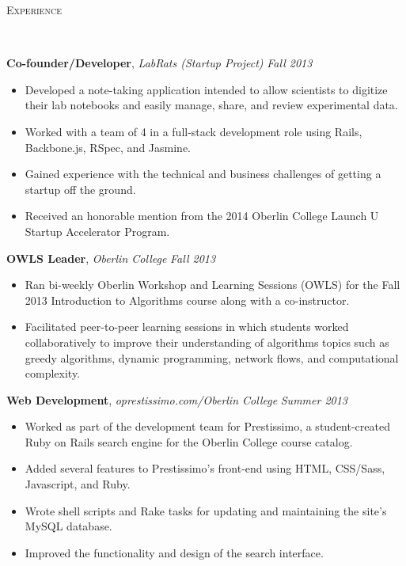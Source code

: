 \documentclass[9pt]{article}
\newenvironment{changemargin}[2]{%
  \begin{list}{}{%
    \setlength{\topsep}{0pt}%
    \setlength{\leftmargin}{#1}%
    \setlength{\rightmargin}{#2}%
    \setlength{\listparindent}{\parindent}%
    \setlength{\itemindent}{\parindent}%
    \setlength{\parsep}{\parskip}%
  }%
  \item[]}{\end{list}
}
\newcommand{\lineover}{
	\begin{changemargin}{-0.05in}{-0.05in}
		\vspace*{-8pt}
		\hrulefill \\
		\vspace*{-2pt}
	\end{changemargin}
}
\newcommand{\header}[1]{
	\begin{changemargin}{-0.5in}{-0.5in}
		\scshape{#1}\\
  	\lineover
	\end{changemargin}
}
\newenvironment{body} {
	\vspace*{-16pt}
	\begin{changemargin}{-0.25in}{-0.5in}
  }	
	{\end{changemargin}
}
\begin{document}
\header{Experience}

\begin{body}
	\vspace{14pt}

	\textbf{Co-founder/Developer}, \emph{LabRats (Startup Project)} \hfill \emph{Fall 2013}\\
	\vspace*{-4pt}
	\begin{itemize} \itemsep -0pt  %
		\item Developed a note-taking application intended to allow scientists to digitize their lab notebooks and easily manage, share, and review experimental data.
		\item Worked with a team of 4 in a full-stack development role using Rails, Backbone.js, RSpec, and Jasmine.
		\item Gained experience with the technical and business challenges of getting a startup off the ground.
		\item Received an honorable mention from the 2014 Oberlin College Launch U Startup Accelerator Program.
	\end{itemize}

	\textbf{OWLS Leader}, \emph{Oberlin College} \hfill \emph{Fall 2013}\\
	\vspace*{-4pt}
	\begin{itemize} \itemsep -0pt  %
		\item Ran bi-weekly Oberlin Workshop and Learning Sessions (OWLS) for the Fall 2013 Introduction to Algorithms course along with a co-instructor.
		\item Facilitated peer-to-peer learning sessions in which students worked collaboratively to improve their understanding of algorithms topics such as greedy algorithms, dynamic programming, network flows, and computational complexity.
	\end{itemize}

	\textbf{Web Development}, \emph{oprestissimo.com/Oberlin College} \hfill \emph{Summer 2013}\\
	\vspace*{-4pt}
	\begin{itemize} \itemsep -0pt  %
		\item Worked as part of the development team for Prestissimo, a student-created Ruby on Rails search engine for the  Oberlin College course catalog.
		\item Added several features to Prestissimo's front-end using HTML, CSS/Sass, Javascript, and Ruby.
		\item Wrote shell scripts and Rake tasks for updating and maintaining the site's MySQL database.
		\item Improved the functionality and design of the search interface.
	\end{itemize}


\end{body}
\end{document}
